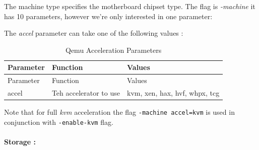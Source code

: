 \documentclass[
  14pt,
  english,
  a4paper,
]{scrreprt}
\begin{document}
The machine type specifies the motherboard chipset type. The flag is
\emph{-machine} it has 10 parameters, however we're only interested in
one parameter:

The \emph{accel} parameter can take one of the following values :

\hypertarget{tbl:qemu_accel_param}{}
\begin{longtable}[]{@{}lll@{}}
\caption{\label{tbl:qemu_accel_param}Qemu Acceleration
Parameters}\tabularnewline
\toprule
\begin{minipage}[b]{0.15\columnwidth}\raggedright
Parameter\strut
\end{minipage} & \begin{minipage}[b]{0.32\columnwidth}\raggedright
Function\strut
\end{minipage} & \begin{minipage}[b]{0.41\columnwidth}\raggedright
Values\strut
\end{minipage}\tabularnewline
\midrule
\endfirsthead
\toprule
\begin{minipage}[b]{0.15\columnwidth}\raggedright
Parameter\strut
\end{minipage} & \begin{minipage}[b]{0.32\columnwidth}\raggedright
Function\strut
\end{minipage} & \begin{minipage}[b]{0.41\columnwidth}\raggedright
Values\strut
\end{minipage}\tabularnewline
\midrule
\endhead
\begin{minipage}[t]{0.15\columnwidth}\raggedright
accel\strut
\end{minipage} & \begin{minipage}[t]{0.32\columnwidth}\raggedright
Teh accelerator to use\strut
\end{minipage} & \begin{minipage}[t]{0.41\columnwidth}\raggedright
kvm, xen, hax, hvf, whpx, tcg\strut
\end{minipage}\tabularnewline
\bottomrule
\end{longtable}

Note that for full \emph{kvm} acceleration the flag
\texttt{-machine\ accel=kvm} is used in conjunction with
\texttt{-enable-kvm} flag.

\hypertarget{storage}{%
\paragraph*{Storage :}\label{storage}}
\end{document}
